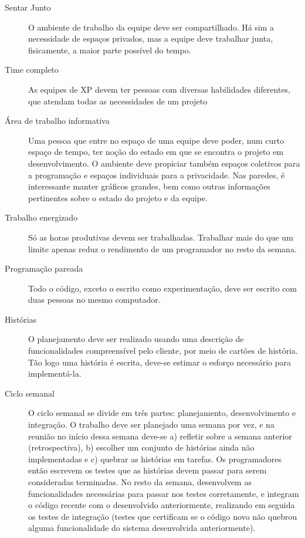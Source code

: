     \begin{description}
      \item[Sentar Junto]
      O ambiente de trabalho da equipe deve ser compartilhado. Há sim a necessidade de espaços privados, mas a equipe deve trabalhar junta, fisicamente, a maior parte possível do tempo.
      \item[Time completo]
      As equipes de XP devem ter pessoas com diversas habilidades diferentes, que atendam todas as necessidades de um projeto
      \item[Área de trabalho informativa]
      Uma pessoa que entre no espaço de uma equipe deve poder, num curto espaço de tempo, ter noção do estado em que se encontra o projeto em desenvolvimento. O ambiente deve propiciar também espaços coletivos para a programação e espaços individuais para a privacidade. Nas paredes, é interessante manter gráficos grandes, bem como outras informações pertinentes sobre o estado do projeto e da equipe.
      \item[Trabalho energizado]
      Só as horas produtivas devem ser trabalhadas. Trabalhar mais do que um limite apenas reduz o rendimento de um programador no resto da semana.
      \item[Programação pareada]
      Todo o código, exceto o escrito como experimentação, deve ser escrito com duas pessoas no mesmo computador.
      \item[Histórias]
      O planejamento deve ser realizado usando uma descrição de funcionalidades compreensível pelo cliente, por meio de cartões de história. Tão logo uma história é escrita, deve-se estimar o esforço necessário para implementá-la.
      \item[Ciclo semanal]
      O ciclo semanal se divide em três partes: planejamento, desenvolvimento e integração. O trabalho deve ser planejado uma semana por vez, e na reunião no início dessa semana deve-se a) refletir sobre a semana anterior (retrospectiva), b) escolher um conjunto de histórias ainda não implementadas e c) quebrar as histórias em tarefas. Os programadores então escrevem os testes que as histórias devem passar para serem consideradas terminadas. No resto da semana, desenvolvem as funcionalidades necessárias para passar nos testes corretamente, e integram o código recente com o desenvolvido anteriormente, realizando em seguida os testes de integração (testes que certificam se o código novo não quebrou alguma funcionalidade do sistema desenvolvida anteriormente).


\end{description}
